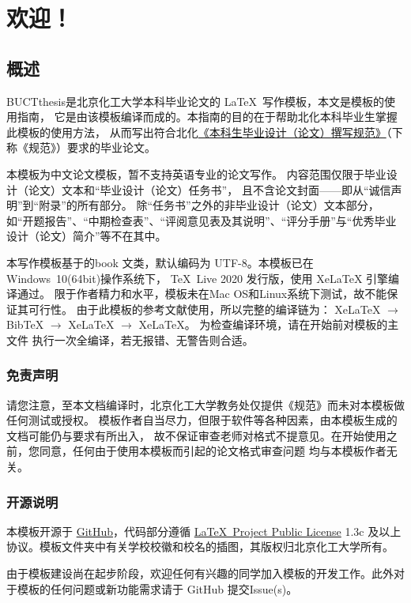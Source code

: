\chapter{欢迎！}
\section{概述}
BUCTthesis是北京化工大学本科毕业论文的 \LaTeX\ 写作模板，本文是模板的使用指南，
它是由该模板编译而成的。本指南的目的在于帮助北化本科毕业生掌握此模板的使用方法，
从而写出符合北化\href{https://jiaowuchu.buct.edu.cn/2018/1009/c515a22046/page.htm}%
{《本科生毕业设计（论文）撰写规范》}（下称《规范》）要求的毕业论文。

本模板为中文论文模板，暂不支持英语专业的论文写作。
内容范围仅限于毕业设计（论文）文本和“毕业设计（论文）任务书”，
且不含论文封面——即从“诚信声明”到“附录”的所有部分。
除“任务书”之外的非毕业设计（论文）文本部分，
如“开题报告”、“中期检查表”、“评阅意见表及其说明”、“评分手册”与“优秀毕业设计（论文）简介”等不在其中。

本写作模板基于\CTeX{}的book 文类，默认编码为 UTF-8。本模板已在Windows\ 10(64bit)操作系统下，
\TeX\ Live 2020 发行版，使用 XeLaTeX 引擎编译通过。
限于作者精力和水平，模板未在Mac OS和Linux系统下测试，故不能保证其可行性。
由于此模板的参考文献使用\BibTeX{}，所以完整的编译链为：
XeLaTeX $\to$ BibTeX{} $\to$ XeLaTeX{} $\to$ XeLaTeX{}。
为检查编译环境，请在开始前对模板的主文件  执行一次全编译，若无报错、无警告则合适。

\subsection{免责声明}
请您注意，至本文档编译时，北京化工大学教务处仅提供《规范》而未对本模板做任何测试或授权。
模板作者自当尽力，但限于软件等各种因素，由本模板生成的文档可能仍与要求有所出入，
故不保证审查老师对格式不提意见。在开始使用之前，您同意，任何由于使用本模板而引起的论文格式审查问题
均与本模板作者无关。

\subsection{开源说明}
本模板开源于 \href{https://github.com/Miracle0565/BUCTthesis}{GitHub}，代码部分遵循 \href{https://www.latex-project.org/lppl.txt}{\LaTeX\ Project Public License} 1.3c 及以上协议。模板文件夹中有关学校校徽和校名的插图，其版权归北京化工大学所有。

由于模板建设尚在起步阶段，欢迎任何有兴趣的同学加入模板的开发工作。此外对于模板的任何问题或新功能需求请于 GitHub 提交Issue(s)。

